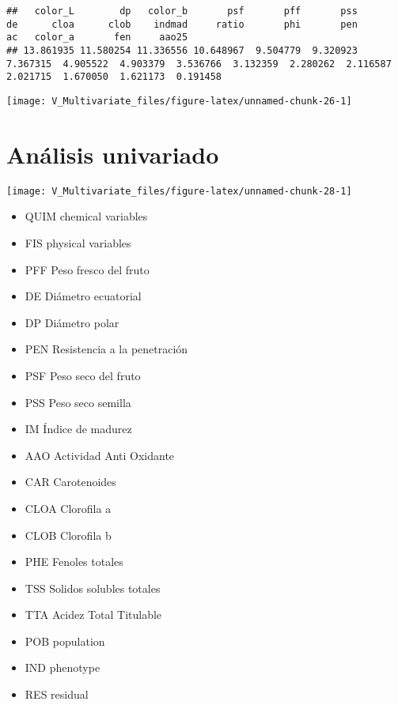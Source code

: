 \documentclass[
]{article}
\begin{document}
\begin{verbatim}
##   color_L        dp   color_b       psf       pff       pss        de      cloa      clob    indmad     ratio       phi       pen        ac   color_a       fen     aao25 
## 13.861935 11.580254 11.336556 10.648967  9.504779  9.320923  7.367315  4.905522  4.903379  3.536766  3.132359  2.280262  2.116587  2.021715  1.670050  1.621173  0.191458
\end{verbatim}

\begin{center}\texttt{[image: V\_Multivariate\_files/figure-latex/unnamed-chunk-26-1]} \end{center}

\section{Análisis univariado}\label{anuxe1lisis-univariado}

\begin{center}\texttt{[image: V\_Multivariate\_files/figure-latex/unnamed-chunk-28-1]} \end{center}

\begin{itemize}
\item
  QUIM chemical variables
\item
  FIS physical variables
\item
  PFF Peso fresco del fruto
\item
  DE Diámetro ecuatorial
\item
  DP Diámetro polar
\item
  PEN Resistencia a la penetración
\item
  PSF Peso seco del fruto
\item
  PSS Peso seco semilla
\item
  IM Índice de madurez
\item
  AAO Actividad Anti Oxidante
\item
  CAR Carotenoides
\item
  CLOA Clorofila a
\item
  CLOB Clorofila b
\item
  PHE Fenoles totales
\item
  TSS Solidos solubles totales
\item
  TTA Acidez Total Titulable
\item
  POB population
\item
  IND phenotype
\item
  RES residual
\end{itemize}
\end{document}
